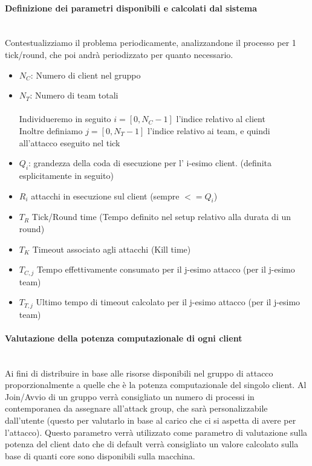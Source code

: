 \documentclass[11pt]{article}
\begin{document}
\paragraph{Definizione dei parametri disponibili e calcolati dal sistema}\mbox{}\\
Contestualizziamo il problema periodicamente, analizzandone il processo per 1 tick/round, che poi andrà periodizzato per quanto necessario.
\begin{itemize}

	\item $N_C$: Numero di client nel gruppo
	\item $N_T$: Numero di team totali\\\\
	Individueremo in seguito $i = [0,N_C-1]$ l'indice relativo al client\\
	Inoltre definiamo $j = [0, N_T-1]$ l'indice relativo ai team, e quindi all'attacco eseguito nel tick
	\item $Q_i$: grandezza della coda di esecuzione per l' i-esimo client. (definita esplicitamente in seguito)
	\item $R_i$ attacchi in esecuzione sul client (sempre $<= Q_i$)
	\item $T_R$ Tick/Round time (Tempo definito nel setup relativo alla durata di un round)
	\item $T_K$ Timeout associato agli attacchi (Kill time)
	\item $T_{C,j}$ Tempo effettivamente consumato per il j-esimo attacco (per il j-esimo team)
	\item $T_{T,j}$ Ultimo tempo di timeout calcolato per il j-esimo attacco (per il j-esimo team)
	
\end{itemize}
\paragraph{Valutazione della potenza computazionale di ogni client}\mbox{}\\
Ai fini di distribuire in base alle risorse disponibili nel gruppo di attacco proporzionalmente a quelle che è la potenza computazionale del singolo client. Al Join/Avvio di un gruppo verrà consigliato un numero di processi in contemporanea da assegnare all'attack group, che sarà personalizzabile dall'utente (questo per valutarlo in base al carico che ci si aspetta di avere per l'attacco). Questo parametro verrà utilizzato come parametro di valutazione sulla potenza del client dato che di default verrà consigliato un valore calcolato sulla base di quanti core sono disponibili sulla macchina.
\end{document}

